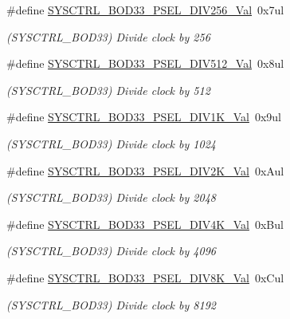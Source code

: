 \begin{DoxyCompactItemize}
\#define \mbox{\hyperlink{group___s_a_m_d21___s_y_s_c_t_r_l_ga95f3b802f7ea30a2ab5207fe3c016f1b}{S\+Y\+S\+C\+T\+R\+L\+\_\+\+B\+O\+D33\+\_\+\+P\+S\+E\+L\+\_\+\+D\+I\+V256\+\_\+\+Val}}~0x7ul
\begin{DoxyCompactList}\small\item\em (S\+Y\+S\+C\+T\+R\+L\+\_\+\+B\+O\+D33) Divide clock by 256 \end{DoxyCompactList}\item 
\#define \mbox{\hyperlink{group___s_a_m_d21___s_y_s_c_t_r_l_ga424d90a7de1f466d27d5f90aa3bc19c2}{S\+Y\+S\+C\+T\+R\+L\+\_\+\+B\+O\+D33\+\_\+\+P\+S\+E\+L\+\_\+\+D\+I\+V512\+\_\+\+Val}}~0x8ul
\begin{DoxyCompactList}\small\item\em (S\+Y\+S\+C\+T\+R\+L\+\_\+\+B\+O\+D33) Divide clock by 512 \end{DoxyCompactList}\item 
\#define \mbox{\hyperlink{group___s_a_m_d21___s_y_s_c_t_r_l_gadc93b38cb160451749cb5e30c7ec5a44}{S\+Y\+S\+C\+T\+R\+L\+\_\+\+B\+O\+D33\+\_\+\+P\+S\+E\+L\+\_\+\+D\+I\+V1\+K\+\_\+\+Val}}~0x9ul
\begin{DoxyCompactList}\small\item\em (S\+Y\+S\+C\+T\+R\+L\+\_\+\+B\+O\+D33) Divide clock by 1024 \end{DoxyCompactList}\item 
\#define \mbox{\hyperlink{group___s_a_m_d21___s_y_s_c_t_r_l_ga8a97aa63e41934e47cc2a4421c6d9aa7}{S\+Y\+S\+C\+T\+R\+L\+\_\+\+B\+O\+D33\+\_\+\+P\+S\+E\+L\+\_\+\+D\+I\+V2\+K\+\_\+\+Val}}~0x\+Aul
\begin{DoxyCompactList}\small\item\em (S\+Y\+S\+C\+T\+R\+L\+\_\+\+B\+O\+D33) Divide clock by 2048 \end{DoxyCompactList}\item 
\#define \mbox{\hyperlink{group___s_a_m_d21___s_y_s_c_t_r_l_ga3a011b2e2e4554a87a3da77e09cbab08}{S\+Y\+S\+C\+T\+R\+L\+\_\+\+B\+O\+D33\+\_\+\+P\+S\+E\+L\+\_\+\+D\+I\+V4\+K\+\_\+\+Val}}~0x\+Bul
\begin{DoxyCompactList}\small\item\em (S\+Y\+S\+C\+T\+R\+L\+\_\+\+B\+O\+D33) Divide clock by 4096 \end{DoxyCompactList}\item 
\#define \mbox{\hyperlink{group___s_a_m_d21___s_y_s_c_t_r_l_gaf71f1b0ebea6815f734e81037b3ffce4}{S\+Y\+S\+C\+T\+R\+L\+\_\+\+B\+O\+D33\+\_\+\+P\+S\+E\+L\+\_\+\+D\+I\+V8\+K\+\_\+\+Val}}~0x\+Cul
\begin{DoxyCompactList}\small\item\em (S\+Y\+S\+C\+T\+R\+L\+\_\+\+B\+O\+D33) Divide clock by 8192 \end{DoxyCompactList}\item 

\end{DoxyCompactItemize}
